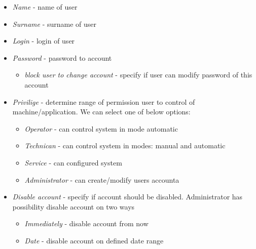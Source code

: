 	\begin{itemize}
		\item \textit{Name} - name of user
		\item \textit{Surname} - surname of user
		\item \textit{Login} - login of user
		\item \textit{Password} - password to account
		\begin{itemize}
			\item \textit{block user to change account} - specify if user can modify password of this account
		\end{itemize}
		\item \textit{Privilige} - determine range of permission user to control of machine/application. We can select one of below options:
			\begin{itemize}
				\item \textit{Operator} - can control system in mode automatic
				\item \textit{Technican} - can control system in modes: manual and automatic
				\item \textit{Service} - can configured system
				\item \textit{Administrator} - can create/modify users accounta
			\end{itemize}
		\item \textit{Disable account} - specify if account should be disabled. Administrator has possibility disable account on two ways
		\begin{itemize}
			\item \textit{Immediately} - disable account from now
			\item \textit{Date} - disable account on defined date range  
		\end{itemize}
	\end{itemize}